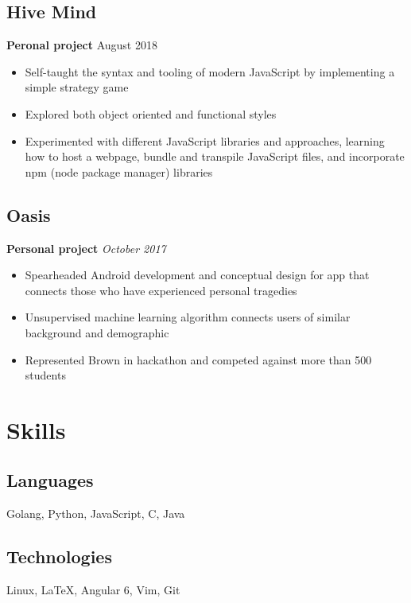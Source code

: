 \documentclass[11pt]{article}
\begin{document}
\subsection{Hive Mind} 
\textbf{Peronal project} \hfill August 2018
\begin{itemize}
	\item Self-taught the syntax and tooling of modern JavaScript by implementing a simple strategy game 
	\item Explored both object oriented and functional styles 
	\item Experimented with different JavaScript libraries and approaches, learning how to host a webpage, bundle and transpile JavaScript files, and incorporate npm (node package manager) libraries  
\end{itemize}

\subsection{Oasis} 
\textbf{Personal project} \hfill \textit{October 2017}
\begin{itemize}
	\item Spearheaded Android development and conceptual design for app that connects those who have
experienced personal tragedies
	\item Unsupervised machine learning algorithm connects users of similar background and demographic
	\item Represented Brown in hackathon and competed against more than 500 students
\end{itemize}



\section{Skills}
\begin{minipage}{20em}
	\subsection{Languages}
		Golang, Python, JavaScript, C, Java
\end{minipage}
\begin{minipage}{25em}
	\subsection{Technologies}
	Linux, \LaTeX , Angular 6, Vim, Git 	
\end{minipage}
\end{document}
